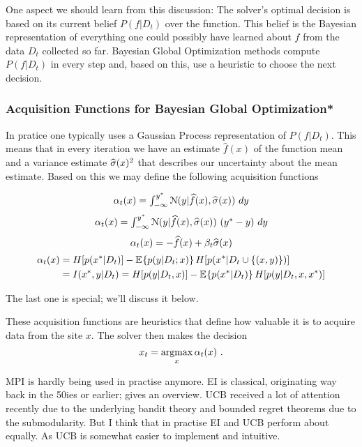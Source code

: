 One aspect we should learn from this discussion: The solver's
optimal decision is based on its current belief $P(f|D_t)$ over the
function. This belief is the Bayesian representation of everything one
could possibly have learned about $f$ from the data $D_t$ collected so
far. Bayesian Global Optimization methods compute $P(f|D_t)$ in every
step and, based on this, use a heuristic to choose the next decision.

\subsubsection{Acquisition Functions for Bayesian Global Optimization*}

In pratice one typically uses a Gaussian Process representation of
$P(f|D_t)$. This means that in every iteration we have an estimate $\hat
f(x)$ of the function mean and a variance estimate $\widehat{\sigma}(x)^2$ that
describes our uncertainty about the mean estimate. Based on this we
may define the following acquisition functions
\begin{myDefinition}\qquad
{}
\begin{equation}
\alpha_t(x) = \textstyle\int_{-\infty}^{y^*} {\cal N}(y|\widehat f(x),\widehat{\sigma}(x))~ dy
\end{equation}
\begin{equation}
\alpha_t(x) = \textstyle\int_{-\infty}^{y^*} {\cal N}(y|\widehat f(x),\widehat{\sigma}(x))~ (y^*-y)~ dy
\end{equation}
\begin{equation}
\alpha_t(x) = - \widehat f(x) + \beta_t \widehat{\sigma}(x)
\end{equation}
 \cite{NIPS2014_5324}
\begin{align}
\alpha_t(x)
&= H[p(x^*|D_t)] - \mathbb{E}_{}\!\left\{p(y|D_t;x)\right\}{H[p(x^*|D_t \cup \{(x,y)\})]} \\
&= I(x^*,y|D_t) = H[p(y|D_t,x)] - \mathbb{E}_{}\!\left\{p(x^*|D_t)\right\}{H[p(y|D_t,x,x^*)]} \nonumber
\end{align}
\end{myDefinition}
The last one is special; we'll discuss it below.

These acquisition functions are heuristics that define how valuable it
is to acquire data from the site $x$. The solver then makes the
decision
\begin{equation}
x_t = \operatorname*{argmax}_x \alpha_t(x) ~.
\end{equation}

MPI is hardly being used in practise anymore. EI is classical,
originating way back in the 50ies or earlier; \citet{jones-et-al:98}
gives an overview.  UCB received a lot of attention recently due to
the underlying bandit theory and bounded regret theorems due to the
submodularity. But I think that in practise EI and UCB perform about
equally. As UCB is somewhat easier to implement and intuitive.

